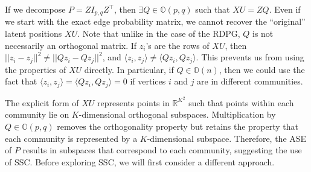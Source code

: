 \documentclass[12pt]{article}
\begin{document}
If we decompose \(P = Z I_{p, q} Z^\top\), then
\(\exists Q \in \mathbb{O}(p, q)\) such that \(XU = Z Q\). Even if we
start with the exact edge probability matrix, we cannot recover the
``original'' latent positions \(XU\). Note that unlike in the case of
the RDPG, \(Q\) is not necessarily an orthogonal matrix. If \(z_i\)'s
are the rows of \(XU\), then
\(||z_i - z_j||^2 \neq ||Q z_i - Q z_j||^2\), and
\(\langle z_i, z_j \rangle \neq \langle Q z_i, Q z_j \rangle\). This
prevents us from using the properties of \(XU\) directly. In particular,
if \(Q \in \mathbb{O}(n)\), then we could use the fact that
\(\langle z_i, z_j \rangle = \langle Q z_i, Q z_j \rangle = 0\) if
vertices \(i\) and \(j\) are in different communities.

The explicit form of \(XU\) represents points in \(\mathbb{R}^{K^2}\)
such that points within each community lie on \(K\)-dimensional
orthogonal subspaces. Multiplication by \(Q \in \mathbb{O}(p, q)\)
removes the orthogonality property but retains the property that each
community is represented by a \(K\)-dimensional subspace. Therefore, the
ASE of \(P\) results in subspaces that correspond to each community,
suggesting the use of SSC. Before exploring SSC, we will first consider
a different approach.
\end{document}
